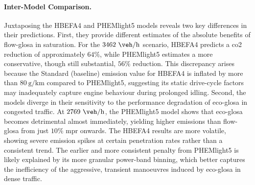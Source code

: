 \paragraph{Inter-Model Comparison.}
Juxtaposing the HBEFA4 and PHEMlight5 models reveals two key differences in their predictions. First, they provide different estimates of the absolute benefits of \ac{flow-glosa} in saturation. For the $3462~\unit{\veh\per\hour}$ scenario, HBEFA4 predicts a \ac{co2} reduction of approximately $64\%$, while PHEMlight5 estimates a more conservative, though still substantial, $56\%$ reduction. This discrepancy arises because the Standard (baseline) emission value for HBEFA4 is inflated by more than $80~\unit{\gram\per\kilo\metre}$ compared to PHEMlight5, suggesting its static drive-cycle factors may inadequately capture engine behaviour during prolonged idling.
\mynewline
Second, the models diverge in their sensitivity to the performance degradation of \ac{eco-glosa} in congested traffic. At $2769~\unit{\veh\per\hour}$, the PHEMlight5 model shows that \ac{eco-glosa} becomes detrimental almost immediately, yielding higher emissions than \ac{flow-glosa} from just $10\%$ \ac{mpr} onwards. The HBEFA4 results are more volatile, showing severe emission spikes at certain penetration rates rather than a consistent trend. The earlier and more consistent penalty from PHEMlight5 is likely explained by its more granular power-band binning, which better captures the inefficiency of the aggressive, transient manoeuvres induced by \ac{eco-glosa} in dense traffic.

